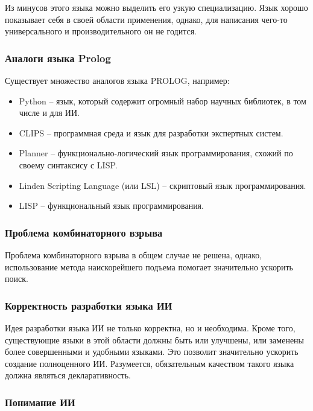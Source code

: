 \documentclass[14pt,a4paper,report]{report}
\begin{document}
Из минусов этого языка можно выделить его узкую специализацию. Язык хорошо показывает себя в своей области применения, однако, для написания чего-то универсального и производительного он не годится.

\subsubsection{Аналоги языка Prolog}

Существует множество аналогов языка PROLOG, например:

\begin{itemize}
	\item Python -- язык, который содержит огромный набор научных библиотек, в том числе и для ИИ.
	\item CLIPS -- программная среда и язык для разработки экспертных систем.
	\item Planner -- функционально-логический язык программирования, схожий по своему синтаксису с LISP.
	\item Linden Scripting Language (или LSL) -- скриптовый язык программирования.
	\item LISP -- функциональный язык программирования.
\end{itemize}

\subsubsection{Проблема комбинаторного взрыва}

Проблема комбинаторного взрыва в общем случае не решена, однако, использование метода наискорейшего подъема помогает значительно ускорить поиск.

\subsubsection{Корректность разработки языка ИИ}

Идея разработки языка ИИ не только корректна, но и необходима. Кроме того, существующие языки в этой области должны быть или улучшены, или заменены более совершенными и удобными языками. Это позволит значительно ускорить создание полноценного ИИ. Разумеется, обязательным качеством такого языка должна являться декларативность.

\subsubsection{Понимание ИИ}
\end{document}
